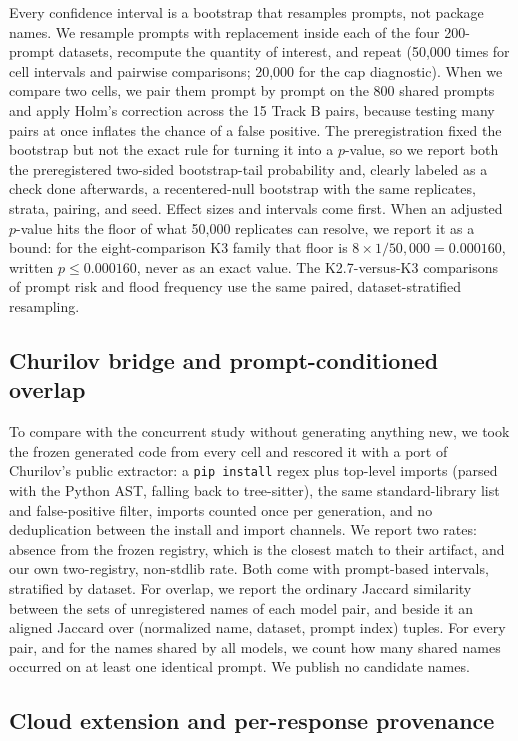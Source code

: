 \documentclass[10pt,twocolumn,letterpaper]{article}
\begin{document}
Every confidence interval is a bootstrap that resamples prompts, not package names. We resample
prompts with replacement inside each of the four 200-prompt datasets, recompute the quantity of
interest, and repeat (50,000 times for cell intervals and pairwise comparisons; 20,000 for the cap
diagnostic). When we compare two cells, we pair them prompt by prompt on the 800 shared prompts and
apply Holm's correction \citep{holm1979simple} across the 15 Track B pairs, because testing many pairs
at once inflates the chance of a false positive. The preregistration fixed the bootstrap but not the
exact rule for turning it into a $p$-value, so we report both the preregistered two-sided
bootstrap-tail probability and, clearly labeled as a check done afterwards, a recentered-null
bootstrap with the same replicates, strata, pairing, and seed. Effect sizes and intervals come first.
When an adjusted $p$-value hits the floor of what 50,000 replicates can resolve, we report it as a
bound: for the eight-comparison K3 family that floor is $8 \times 1/50{,}000 = 0.000160$, written
$p \le 0.000160$, never as an exact value. The K2.7-versus-K3 comparisons of prompt risk and flood
frequency use the same paired, dataset-stratified resampling.

\subsection{Churilov bridge and prompt-conditioned overlap}

To compare with the concurrent study without generating anything new, we took the frozen generated
code from every cell and rescored it with a port of Churilov's public extractor: a \texttt{pip
install} regex plus top-level imports (parsed with the Python AST, falling back to tree-sitter), the
same standard-library list and false-positive filter, imports counted once per generation, and no
deduplication between the install and import channels. We report two rates: absence from the frozen
registry, which is the closest match to their artifact, and our own two-registry, non-stdlib rate.
Both come with prompt-based intervals, stratified by dataset. For overlap, we report the ordinary
Jaccard similarity between the sets of unregistered names of each model pair, and beside it an
aligned Jaccard over (normalized name, dataset, prompt index) tuples. For every pair, and for the
names shared by all models, we count how many shared names occurred on at least one identical prompt.
We publish no candidate names.

\subsection{Cloud extension and per-response provenance}
\end{document}
